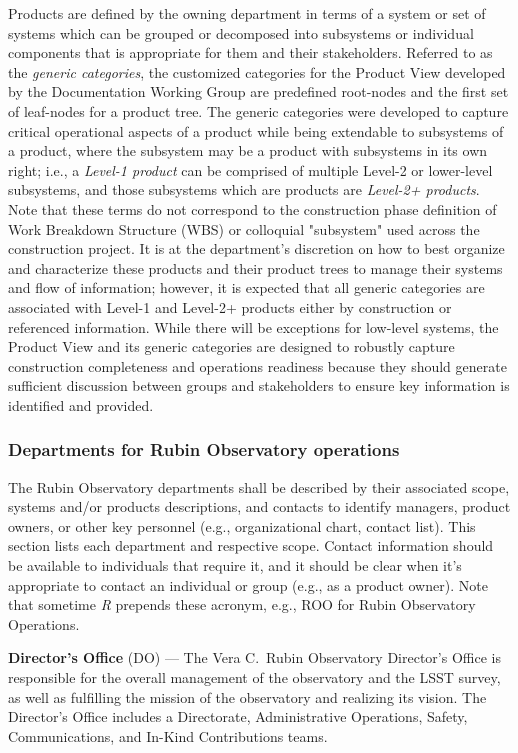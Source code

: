 Products are defined by the owning department in terms of a system or set of systems which can be grouped or decomposed into subsystems or individual components that is appropriate for them and their stakeholders.
Referred to as the \emph{generic categories}, the customized categories for the Product View developed by the Documentation Working Group are predefined root-nodes and the first set of leaf-nodes for a product tree.
The generic categories were developed to capture critical operational aspects of a product while being extendable to subsystems of a product, where the subsystem may be a product with subsystems in its own right; i.e., a \emph{Level-1 product} can be comprised of multiple Level-2 or lower-level subsystems, and those subsystems which are products are \emph{Level-2+ products}.
Note that these terms do not correspond to the construction phase definition of Work Breakdown Structure (WBS) or colloquial "subsystem" used across the construction project.
It is at the department's discretion on how to best organize and characterize these products and their product trees to manage their systems and flow of information; however, it is expected that all generic categories are associated with Level-1 and Level-2+ products either by construction or referenced information.
While there will be exceptions for low-level systems, the Product View and its generic categories are designed to robustly capture construction completeness and operations readiness because they should generate sufficient discussion between groups and stakeholders to ensure key information is identified and provided.

\subsubsection{Departments for Rubin Observatory operations}

The Rubin Observatory departments shall be described by their associated scope, systems and/or products descriptions, and contacts to identify managers, product owners, or other key personnel (e.g., organizational chart, contact list).
This section lists each department and respective scope.
Contact information should be available to individuals that require it, and it should be clear when it's appropriate to contact an individual or group (e.g., as a product owner).
Note that sometime \emph{R} prepends these acronym, e.g., ROO for Rubin Observatory Operations.

\textbf{Director's Office} (DO) ---
The Vera C.\ Rubin Observatory Director's Office is responsible for the overall management of the observatory and the LSST survey, as well as fulfilling the mission of the observatory and realizing its vision.
The Director's Office includes a Directorate, Administrative Operations, Safety, Communications, and In-Kind Contributions teams.

